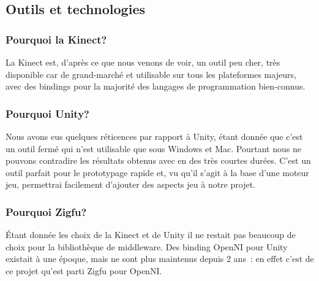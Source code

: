 \subsection{Outils et technologies} 
\subsubsection{Pourquoi la Kinect?}
La Kinect est, d'après ce que nous venons de voir, un outil peu cher, 
très disponible car de grand-marché et utilisable sur tous les plateformes
majeurs, avec des bindings pour la majorité des langages de programmation 
bien-connus.

\subsubsection{Pourquoi Unity?}
Nous avons eus quelques réticences par rapport à Unity, étant donnée que c'est 
un outil fermé qui n'est utilisable que sous Windows et Mac. Pourtant nous ne 
pouvons contradire les résultats obtenus avec en des très courtes durées. C'est
un outil parfait pour le prototypage rapide et, vu qu'il s'agit à la base d'une
moteur jeu, permettrai facilement d'ajouter des aspects jeu à notre projet.

\subsubsection{Pourquoi Zigfu?}
Étant donnée les choix de la Kinect et de Unity il ne restait pas beaucoup de
choix pour la bibliothèque de middleware. Des binding OpenNI pour Unity existait
à une époque, mais ne sont plus maintenus depuis 2 ans~: en effet c'est de ce
projet qu'est parti Zigfu pour OpenNI\cite{zigfu_branch}.
